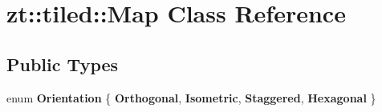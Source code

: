\hypertarget{classzt_1_1tiled_1_1_map}{}\section{zt\+:\+:tiled\+:\+:Map Class Reference}
\label{classzt_1_1tiled_1_1_map}
\subsection*{Public Types}
\begin{DoxyCompactItemize}
\item 
\mbox{\label{classzt_1_1tiled_1_1_map_a9f333709d2b355070a8ba573af0133a5}} 
enum {\bfseries Orientation} \{ {\bfseries Orthogonal}, 
{\bfseries Isometric}, 
{\bfseries Staggered}, 
{\bfseries Hexagonal}
 \}
\end{DoxyCompactItemize}
